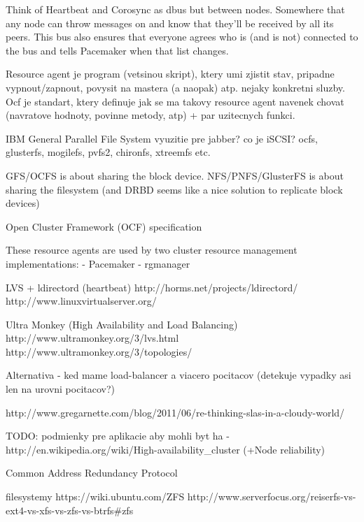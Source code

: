 
Think of Heartbeat and Corosync as dbus but between nodes. Somewhere that any node can throw messages on and know that they’ll be received by all its peers. This bus also ensures that everyone agrees who is (and is not) connected to the bus and tells Pacemaker when that list changes.


Resource agent je program (vetsinou skript), ktery umi zjistit stav, pripadne vypnout/zapnout, povysit na mastera (a naopak) atp. nejaky konkretni sluzby. 
Ocf je standart, ktery definuje jak se ma takovy resource agent navenek chovat (navratove hodnoty, povinne metody, atp) + par uzitecnych funkci.

IBM General Parallel File System
vyuzitie pre jabber?
co je iSCSI?
ocfs, glusterfs, mogilefs, pvfs2, chironfs, xtreemfs etc.

GFS/OCFS is about sharing the block device. NFS/PNFS/GlusterFS is about sharing the filesystem (and DRBD seems like a nice solution to replicate block devices)


Open Cluster Framework (OCF) specification

These resource agents are used by two cluster resource
management implementations:
- Pacemaker
- rgmanager


LVS + ldirectord (heartbeat)
http://horms.net/projects/ldirectord/
http://www.linuxvirtualserver.org/

Ultra Monkey (High Availability and Load Balancing)
http://www.ultramonkey.org/3/lvs.html
http://www.ultramonkey.org/3/topologies/


Alternativa - ked mame load-balancer a viacero pocitacov (detekuje vypadky asi len na urovni pocitacov?)

http://www.gregarnette.com/blog/2011/06/re-thinking-slas-in-a-cloudy-world/

TODO:
podmienky pre aplikacie aby mohli byt ha - http://en.wikipedia.org/wiki/High-availability_cluster (+Node reliability)

Common Address Redundancy Protocol

filesystemy
https://wiki.ubuntu.com/ZFS
http://www.serverfocus.org/reiserfs-vs-ext4-vs-xfs-vs-zfs-vs-btrfs#zfs

